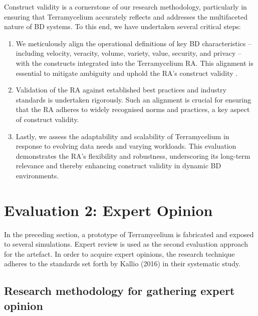 \documentclass[review]{elsarticle}
\begin{document}
Construct validity is a cornerstone of our research methodology, particularly in ensuring that Terramycelium accurately reflects and addresses the multifaceted nature of BD systems. To this end, we have undertaken several critical steps:

\begin{enumerate}

    \item We meticulously align the operational definitions of key BD characteristics -- including velocity, veracity, volume, variety, value, security, and privacy -- with the constructs integrated into the Terramycelium RA. This alignment is essential to mitigate ambiguity and uphold the RA's construct validity \cite{rad2017big}.

    

    

    \item Validation of the RA against established best practices and industry standards is undertaken rigorously. Such an alignment is crucial for ensuring that the RA adheres to widely recognised norms and practices, a key aspect of construct validity.

    

    \item Lastly, we assess the adaptability and scalability of Terramycelium in response to evolving data needs and varying workloads. This evaluation demonstrates the RA's flexibility and robustness, underscoring its long-term relevance and thereby enhancing construct validity in dynamic BD environments.

\end{enumerate}

\section{Evaluation 2: Expert Opinion}

In the preceding section, a prototype of Terramycelium is fabricated and exposed to several simulations. Expert review is used as the second evaluation approach for the artefact. In order to acquire expert opinions, the research technique adheres to the standards set forth by Kallio (2016) in their systematic study.

\subsection{Research methodology for gathering expert opinion}
\end{document}
